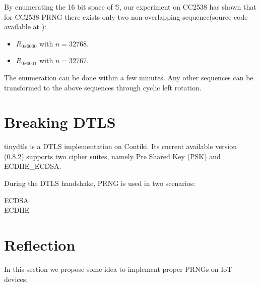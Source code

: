 By enumerating the 16 bit space of $\mathbb{S}$, our experiment on CC2538 has shown that for CC2538 PRNG there exists only two non-overlapping sequence(source code available at \cite{prngtest}):
\begin{itemize}
	\item $R_{0x0000}$ with $n = 32768$.
	\item $R_{0x0001}$ with $n = 32767$.
\end{itemize}
The enumeration can be done within a few minutes. Any other sequences can be transformed to the above sequences through cyclic left rotation. 

\section{Breaking DTLS} \label{BreakDTLS}
tinydtls\cite{tinydtls} is a DTLS implementation on Contiki. Its current available version\cite{tinydtls082} (0.8.2) supports two cipher suites, namely Pre Shared Key (PSK) and ECDHE\_ECDSA\cite{rfc4492}. 

During the DTLS handshake, PRNG is used in two scenarios:
\begin{description}
	\item[ECDSA]
	\item[ECDHE]
\end{description}

\section{Reflection}
In this section we propose some idea to implement proper PRNGs on IoT devices.
